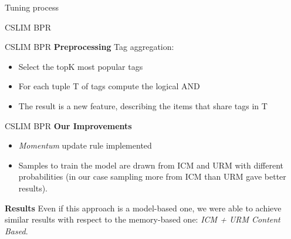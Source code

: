 \documentclass{beamer}
\begin{document}
   \begin{frame}{Tuning process}
   \begin{center}
   \end{center}
 \end{frame}
  \begin{frame}[standout]
  CSLIM BPR
  \end{frame}
  \begin{frame}{CSLIM BPR}
  \textbf{Preprocessing} \hfill \break
   Tag aggregation: 
  		\begin{itemize}
  		\item Select the topK most popular tags
  		\item For each tuple T of tags compute the logical AND
  		\item The result is a new feature, describing the items that share tags in T
  		\end{itemize}
  \end{frame}
	\begin{frame}{CSLIM BPR}
		\textbf{Our Improvements}
		\begin{itemize}
		\item \emph{Momentum} update rule implemented
		\item Samples to train the model are drawn from ICM and URM with different probabilities (in our case sampling more from ICM than URM gave better results).
		\end{itemize}
		\textbf{Results}  \hfill \break
		Even if this approach is a model-based one, we were able to achieve similar results with respect to the memory-based one:  \break \emph{ICM + URM Content Based}.
	\end{frame}
\end{document}
